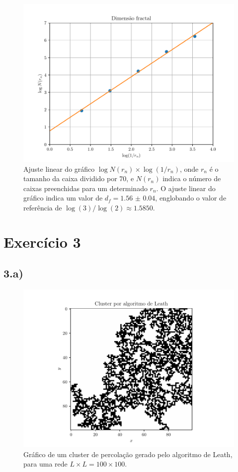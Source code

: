\documentclass[a4paper, brazil]{article}
\begin{document}
\begin{figure}[ht]
\centering
\includegraphics[width=\textwidth]{fig_2.pdf}
\caption{Ajuste linear do gráfico \( \log N(r_n) \times \log(1 / r_n) \), onde \( r_n \) é o tamanho da caixa dividido por 70, e \( N(r_n) \) indica o número de caixas preenchidas para um determinado \( r_n \).
O ajuste linear do gráfico indica um valor de \( d_f = \num{1.56(4)} \), englobando o valor de referência de \( \log(3) / \log(2) \approx \num{1.5850} \).}\label{fig2}
\end{figure}


\newpage
\section{Exercício 3}

\subsection{3.a)}

\begin{figure}[ht]
\centering
\includegraphics[width=\textwidth]{fig_3a.pdf}
\caption{Gráfico de um cluster de percolação gerado pelo algoritmo de Leath, para uma rede \( L \times L = 100 \times 100 \).}\label{fig3a}
\end{figure}
\end{document}
